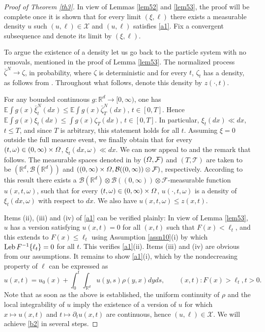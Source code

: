 \documentclass[11pt]{amsart}
\theoremstyle{plain}
\newcommand{\om}{\omega}
\newcommand{\Om}{\mathnormal{\Omega}}
\newcommand{\R}{{\mathbb R}}
\newcommand{\E}{{\mathbb E}}
\newcommand{\calB}{{\mathcal B}}
\newcommand{\calF}{{\mathcal F}}
\newcommand{\calT}{{\mathcal T}}
\newcommand{\calX}{{\mathcal X}}
\newcommand{\pl}{\partial}
\newcommand{\iy}{\infty}
\newcommand{\leb}{\text{\rm Leb}}
\begin{document}
\begin{proof}[Proof of Theorem \ref{th3}]
In view of Lemmas \ref{lem52} and \ref{lem53}, the proof
will be complete once it is shown that for every limit $(\xi,\ell)$
there exists a measurable density $u$ such $(u,\ell)\in\calX$
and $(u,\ell)$ satisfies \eqref{a1}.
Fix a convergent subsequence and denote its limit by $(\xi,\ell)$.

To argue the existence of a density let us go back to
the particle system with no removals,
mentioned in the proof of Lemma \ref{lem53}.
The normalized process $\bar\zeta^N\to\zeta$, in probability, where
$\zeta$ is deterministic and for every $t$, $\zeta_t$
has a density, as follows from
\cite[Theorem 5.3 and Proposition 5.4]{fou-mel}.
Throughout what follows, denote this density
by $z(\cdot,t)$.

For any bounded continuous $g:\R^d\to[0,\iy)$, one has
$\E\int g(x)\bar\xi^N_t(dx)\le\E\int g(x)\bar\zeta^N_T(dx)$, $t\in[0,T]$.
Hence $\E\int g(x)\xi_t(dx)\le\int g(x)\zeta_T(dx)$, $t\in[0,T]$.
In particular, $\xi_t(dx)\ll dx$, $t\le T$, and
since $T$ is arbitrary, this statement holds for all $t$.
Assuming $\xi=0$ outside
the full measure event, we finally obtain that
for every $(t,\om)\in(0,\iy)\times\Om$, $\xi_t(dx,\om)\ll dx$.
We can now appeal to \cite[Theorem 58 in Chapter V (p.\ 52)]{del-mey-82}
and the remark that follows.
The measurable spaces denoted in \cite{del-mey-82}
by $(\Om,\calF)$ and $(T,\calT)$ are taken to be
$(\R^d,\calB(\R^d))$ and $((0,\iy)\times\Om,\calB((0,\iy))\otimes\calF)$, respectively.
According to this result there exists
a $\calB(\R^d)\otimes\calB((0,\iy))\otimes\calF$-measurable function
$u(x,t,\om)$, such that for every $(t,\om)\in(0,\iy)\times\Om$,
$u(\cdot,t,\om)$ is a density of $\xi_t(dx,\om)$ with respect to $dx$.
We also have $u(x,t,\om)\le z(x,t)$.

Items (ii), (iii) and (iv) of \eqref{a1} can be verified plainly:
In view of Lemma \ref{lem53}, $u$ has a version satisfying
$u(x,t)=0$ for all $(x,t)$ such that $F(x)<\ell_t$, and
this extends to $F(x)\le\ell_t$ using Assumption \ref{assn10}(i) by which
$\leb\,F^{-1}\{\ell_t\}=0$ for all $t$.
This verifies \eqref{a1}(ii).
Items (iii) and (iv) are obvious from our assumptions.
It remains to show \eqref{a1}(i),
which by the nondecreasing property of $\ell$ can be expressed as
\begin{equation}\label{b2}
u(x,t)=u_0(x)+\int_0^t\int_{\R^d}u(y,s)\rho(y,x)dyds,
\qquad (x,t):F(x)>\ell_t,t>0.
\end{equation}
Note that as soon as the above is established,
the uniform continuity of $\rho$ and the local integrability of $u$
imply the existence of a version of $u$ for which
$x\mapsto u(x,t)$ and $t\mapsto\pl_tu(x,t)$ are continuous,
hence $(u,\ell)\in\calX$.
We will achieve \eqref{b2} in several steps.


\end{proof}
\end{document}

